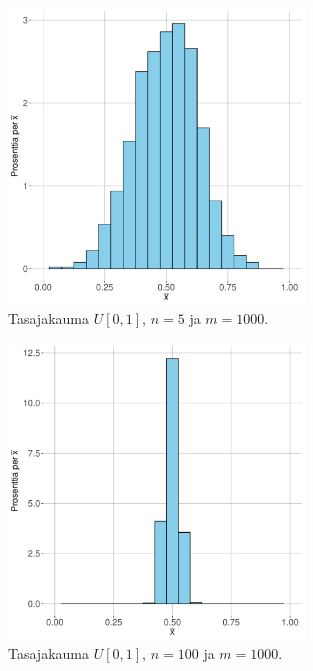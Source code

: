 \documentclass{beamer}
\begin{document}
\begin{frame}
  \begin{center}
    \begin{figure}
      \includegraphics[width=0.7\textwidth, height=0.7\textwidth]{unif-n-5.pdf}
      \caption{Tasajakauma $U[0,1]$, $n = 5$ ja $m = 1000$.}
    \end{figure}
  \end{center}
\end{frame}


\begin{frame}
  \begin{center}
    \begin{figure}
      \includegraphics[width=0.7\textwidth, height=0.7\textwidth]{unif-n-100.pdf}
      \caption{Tasajakauma $U[0,1]$, $n = 100$ ja $m = 1000$.}
    \end{figure}
  \end{center}
\end{frame}
\end{document}
